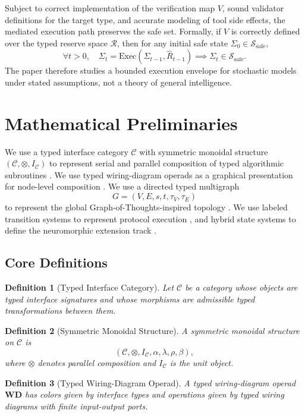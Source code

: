 \documentclass[11pt]{article}
\newtheorem{definition}{Definition}[section]
\theoremstyle{remark}
\begin{document}
Subject to correct implementation of the verification map \(V\), sound validator definitions for the target type, and accurate modeling of tool side effects, the mediated execution path preserves the safe set. Formally, if \(V\) is correctly defined over the typed reserve space \(\mathcal{R}\), then for any initial safe state \(\Sigma_0 \in \mathcal{S}_{\mathrm{safe}}\),
\[
\forall t>0,\quad
\Sigma_t=\mathrm{Exec}(\Sigma_{t-1},\hat{R}_{t-1})
\implies \Sigma_t \in \mathcal{S}_{\mathrm{safe}}.
\]
The paper therefore studies a bounded execution envelope for stochastic models under stated assumptions, not a theory of general intelligence.

\section{Mathematical Preliminaries}

We use a typed interface category \(\mathcal{C}\) with symmetric monoidal structure \((\mathcal{C},\otimes,I_{\mathcal{C}})\) to represent serial and parallel composition of typed algorithmic subroutines \cite{fongspivak2019}. We use typed wiring-diagram operads as a graphical presentation for node-level composition \cite{yau2018}. We use a directed typed multigraph
\[
G=(V,E,s,t,\tau_V,\tau_E)
\]
to represent the global Graph-of-Thoughts-inspired topology \cite{besta2024got}. We use labeled transition systems to represent protocol execution \cite{milner1989}, and hybrid state systems to define the neuromorphic extension track \cite{izhikevich2003}.

\subsection{Core Definitions}

\begin{definition}[Typed Interface Category]
Let \(\mathcal{C}\) be a category whose objects are typed interface signatures and whose morphisms are admissible typed transformations between them.
\end{definition}

\begin{definition}[Symmetric Monoidal Structure]
A symmetric monoidal structure on \(\mathcal{C}\) is
\[
(\mathcal{C},\otimes,I_{\mathcal{C}},\alpha,\lambda,\rho,\beta),
\]
where \(\otimes\) denotes parallel composition and \(I_{\mathcal{C}}\) is the unit object.
\end{definition}

\begin{definition}[Typed Wiring-Diagram Operad]
A typed wiring-diagram operad \(\mathbf{WD}\) has colors given by interface types and operations given by typed wiring diagrams with finite input-output ports.
\end{definition}
\end{document}
